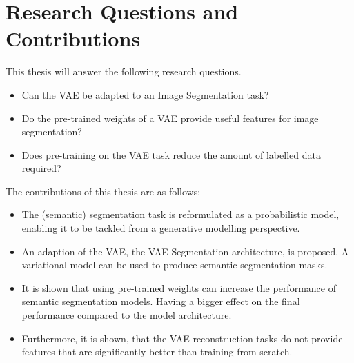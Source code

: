 \section{Research Questions and Contributions}
This thesis will answer the following research questions.
\begin{itemize}
    \item Can the VAE be adapted to an Image Segmentation task?
    \item Do the pre-trained weights of a VAE provide useful features for image segmentation?
    \item Does pre-training on the VAE task reduce the amount of labelled data required?
\end{itemize}
The contributions of this thesis are as follows;
\begin{itemize}
    \item The (semantic) segmentation task is reformulated as a probabilistic model, enabling it to be tackled from a generative modelling perspective.
    \item An adaption of the VAE, the VAE-Segmentation architecture, is proposed. A variational model can be used to produce semantic segmentation masks.
    \item It is shown that using pre-trained weights can increase the performance of semantic segmentation models. Having a bigger effect on the final performance compared to the model architecture.
    \item  Furthermore, it is shown, that the VAE reconstruction tasks do not provide features that are significantly better than training from scratch.
\end{itemize}
